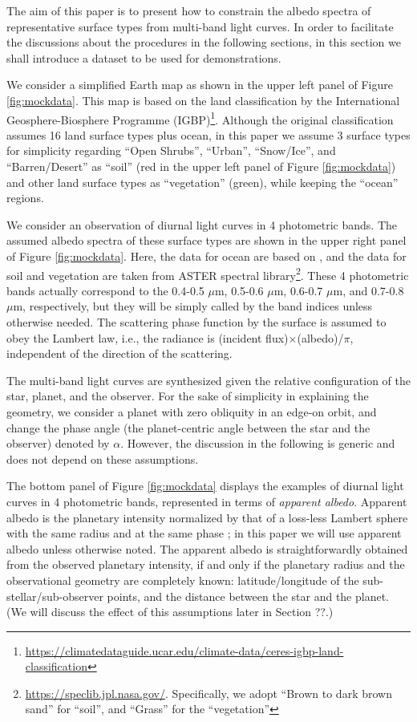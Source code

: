 \documentclass[iop,numberedappendix,apj,]{emulateapj}
\begin{document}
The aim of this paper is to present how to constrain the albedo spectra of representative surface types from multi-band light curves. 
In order to facilitate the discussions about the procedures in the following sections, in this section we shall introduce a dataset to be used for demonstrations. 

We consider a simplified Earth map as shown in the upper left panel of Figure \ref{fig:mockdata}. 
This map is based on the land classification by the International Geosphere-Biosphere Programme (IGBP)\footnote{\url{https://climatedataguide.ucar.edu/climate-data/ceres-igbp-land-classification}}. 
Although the original classification assumes 16 land surface types plus ocean, in this paper we assume 3 surface types for simplicity regarding ``Open Shrubs'', ``Urban'', ``Snow/Ice'', and ``Barren/Desert'' as ``soil'' (red in the upper left panel of Figure \ref{fig:mockdata}) and other land surface types as ``vegetation'' (green), while keeping the ``ocean'' regions. 

We consider an observation of diurnal light curves in 4 photometric bands. 
The assumed albedo spectra of these surface types are shown in the upper right panel of Figure \ref{fig:mockdata}. 
Here, the data for ocean are based on \citet{Mclinden1997}, 
and the data for soil and vegetation are taken from ASTER spectral library\footnote{\url{https://speclib.jpl.nasa.gov/}. 
Specifically, we adopt  ``Brown to dark brown sand'' for ``soil'', and ``Grass'' for the ``vegetation''}. 
These 4 photometric bands actually correspond to the 0.4-0.5 $\mu $m, 0.5-0.6 $\mu $m, 0.6-0.7 $\mu $m, and 0.7-0.8 $\mu $m, respectively, but they will be simply called by the band indices unless otherwise needed. 
The scattering phase function by the surface is assumed to obey the Lambert law, i.e., the radiance is (incident flux)$\times $(albedo)/$\pi$, independent of the direction of the scattering. 

The multi-band light curves are synthesized given the relative configuration of the star, planet, and the observer.  
For the sake of simplicity in explaining the geometry, we consider a planet with zero obliquity in an edge-on orbit, and change the phase angle (the planet-centric angle between the star and the observer) denoted by $\alpha $. 
However, the discussion in the following is generic and does not depend on these assumptions. 

The bottom panel of Figure \ref{fig:mockdata} displays the examples of diurnal light curves in 4 photometric bands, represented in terms of {\it apparent albedo}. 
Apparent albedo is the planetary intensity normalized by that of a loss-less Lambert sphere with the same radius and at the same phase \citep{Qiu2003, Seager2010}; in this paper we will use apparent albedo unless otherwise noted. 
The apparent albedo is straightforwardly obtained from the observed planetary intensity, if and only if the planetary radius and the observational geometry are completely known: latitude/longitude of the sub-stellar/sub-observer points, and the distance between the star and the planet. 
(We will discuss the effect of this assumptions later in Section ??.)
\end{document}
